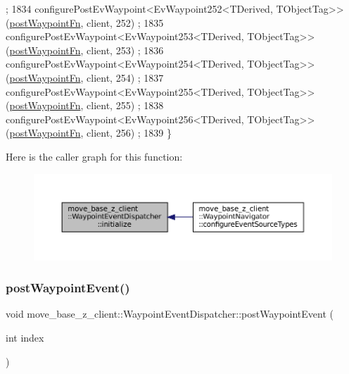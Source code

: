 \begin{DoxyCode}
      ;
1834     configurePostEvWaypoint<EvWaypoint252<TDerived, TObjectTag>>(\hyperlink{classmove__base__z__client_1_1WaypointEventDispatcher_acc538eb7506c13f7cca2268a1742dadd}{postWaypointFn}, client, 252)
      ;
1835     configurePostEvWaypoint<EvWaypoint253<TDerived, TObjectTag>>(\hyperlink{classmove__base__z__client_1_1WaypointEventDispatcher_acc538eb7506c13f7cca2268a1742dadd}{postWaypointFn}, client, 253)
      ;
1836     configurePostEvWaypoint<EvWaypoint254<TDerived, TObjectTag>>(\hyperlink{classmove__base__z__client_1_1WaypointEventDispatcher_acc538eb7506c13f7cca2268a1742dadd}{postWaypointFn}, client, 254)
      ;
1837     configurePostEvWaypoint<EvWaypoint255<TDerived, TObjectTag>>(\hyperlink{classmove__base__z__client_1_1WaypointEventDispatcher_acc538eb7506c13f7cca2268a1742dadd}{postWaypointFn}, client, 255)
      ;
1838     configurePostEvWaypoint<EvWaypoint256<TDerived, TObjectTag>>(\hyperlink{classmove__base__z__client_1_1WaypointEventDispatcher_acc538eb7506c13f7cca2268a1742dadd}{postWaypointFn}, client, 256)
      ;
1839 \}
\end{DoxyCode}
Here is the caller graph for this function\+:
\nopagebreak
\begin{figure}[H]
\begin{center}
\leavevmode
\includegraphics[width=350pt]{classmove__base__z__client_1_1WaypointEventDispatcher_a70fc3a92c59e40648f350f3912d736ae_icgraph}
\end{center}
\end{figure}
\mbox{\label{classmove__base__z__client_1_1WaypointEventDispatcher_a7421f1eb8aae15a3ddde7c50bea87648}} 
\subsubsection{\texorpdfstring{post\+Waypoint\+Event()}{postWaypointEvent()}}
{\footnotesize\ttfamily void move\+\_\+base\+\_\+z\+\_\+client\+::\+Waypoint\+Event\+Dispatcher\+::post\+Waypoint\+Event (\begin{DoxyParamCaption}\item[{int}]{index }\end{DoxyParamCaption})}



